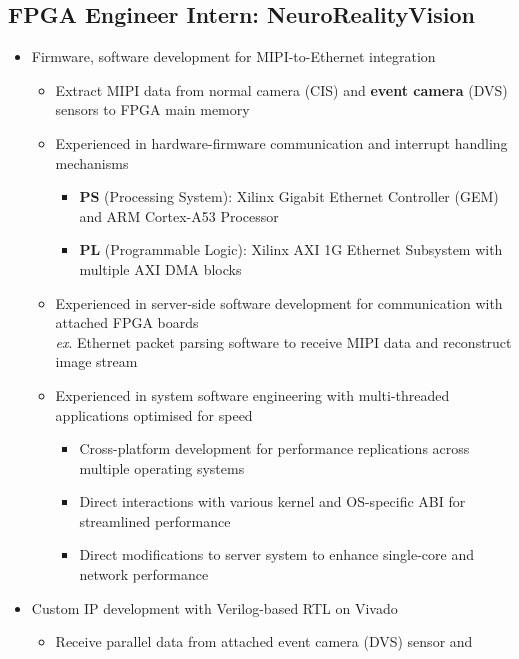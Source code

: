 \documentclass[10pt]{article}
\begin{document}
\subsection*{FPGA Engineer Intern: NeuroRealityVision} \label{intern1}
\begin{itemize}
  \item Firmware, software development for MIPI-to-Ethernet integration
    \begin{itemize}
      \item Extract MIPI data from normal camera (CIS) and
        \textbf{event camera} (DVS) sensors to FPGA main memory
      \item Experienced in hardware-firmware communication and interrupt
        handling mechanisms
        \begin{itemize}
          \item \textbf{PS} (Processing System): Xilinx Gigabit Ethernet
            Controller (GEM) and ARM Cortex-A53 Processor
          \item \textbf{PL} (Programmable Logic): Xilinx AXI 1G Ethernet
            Subsystem with multiple AXI DMA blocks
        \end{itemize}
      \item Experienced in server-side software development for communication
        with attached FPGA boards \\
        \textit{ex}. Ethernet packet parsing software to receive MIPI data and
          reconstruct image stream
      \item Experienced in system software engineering with multi-threaded
        applications optimised for speed
        \begin{itemize}
          \item Cross-platform development for performance replications across
            multiple operating systems
          \item Direct interactions with various kernel and OS-specific ABI
            for streamlined performance
          \item Direct modifications to server system to enhance single-core
            and network performance
        \end{itemize}
    \end{itemize}
  \item Custom IP development with Verilog-based RTL on Vivado
    \begin{itemize}
      \item Receive parallel data from attached event camera (DVS) sensor and

\end{itemize}
\end{itemize}
\end{document}
